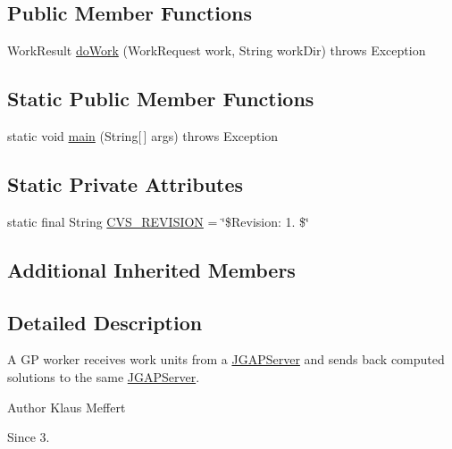 \subsection*{Public Member Functions}
\begin{DoxyCompactItemize}
\item 
Work\-Result \hyperlink{classorg_1_1jgap_1_1distr_1_1grid_1_1gp_1_1_j_g_a_p_worker_g_p_aa04fd0437862a49fe5fce45084c0590f}{do\-Work} (Work\-Request work, String work\-Dir)  throws Exception 
\end{DoxyCompactItemize}
\subsection*{Static Public Member Functions}
\begin{DoxyCompactItemize}
\item 
static void \hyperlink{classorg_1_1jgap_1_1distr_1_1grid_1_1gp_1_1_j_g_a_p_worker_g_p_a1d015ea6b928af99f7879b974e317fce}{main} (String\mbox{[}$\,$\mbox{]} args)  throws Exception 
\end{DoxyCompactItemize}
\subsection*{Static Private Attributes}
\begin{DoxyCompactItemize}
\item 
static final String \hyperlink{classorg_1_1jgap_1_1distr_1_1grid_1_1gp_1_1_j_g_a_p_worker_g_p_a793842b038b3f6e753208dcc0d9f8d9f}{C\-V\-S\-\_\-\-R\-E\-V\-I\-S\-I\-O\-N} = \char`\"{}\$Revision\-: 1. \$\char`\"{}
\end{DoxyCompactItemize}
\subsection*{Additional Inherited Members}


\subsection{Detailed Description}
A G\-P worker receives work units from a \hyperlink{classorg_1_1jgap_1_1distr_1_1grid_1_1_j_g_a_p_server}{J\-G\-A\-P\-Server} and sends back computed solutions to the same \hyperlink{classorg_1_1jgap_1_1distr_1_1grid_1_1_j_g_a_p_server}{J\-G\-A\-P\-Server}.

\begin{DoxyAuthor}{Author}
Klaus Meffert 
\end{DoxyAuthor}
\begin{DoxySince}{Since}
3. 
\end{DoxySince}


